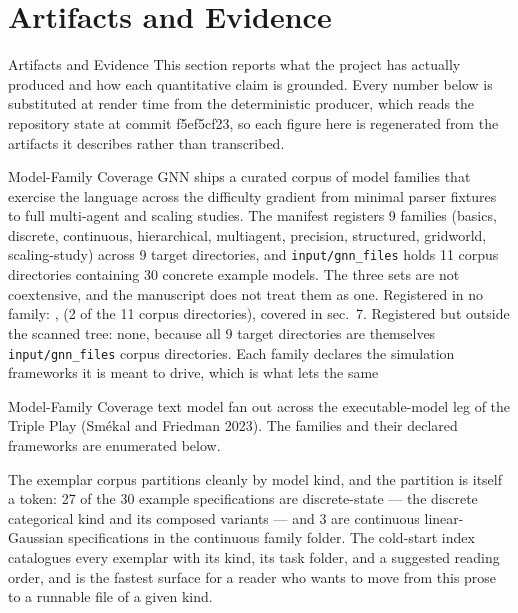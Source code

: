 \documentclass[
  ignorenonframetext,
]{beamer}
\author{\texorpdfstring{}{}}
\date{}
\newcounter{none} %
\begin{document}
\section{Artifacts and Evidence}\label{sec:artifacts_evidence}

\begin{frame}[allowframebreaks]{Artifacts and Evidence}
This section reports what the project has actually produced and how each
quantitative claim is grounded. Every number below is substituted at
render time from the deterministic producer, which reads the repository
state at commit f5ef5cf23, so each figure here is regenerated from the
artifacts it describes rather than transcribed.
\end{frame}

\begin{frame}{Model-Family Coverage}
\protect{}\label{model-family-coverage}
GNN ships a curated corpus of model families that exercise the language
across the difficulty gradient from minimal parser fixtures to full
multi-agent and scaling studies. The manifest registers 9 families
(basics, discrete, continuous, hierarchical, multiagent, precision,
structured, gridworld, scaling-study) across 9 target directories, and
\texttt{input/gnn\_files} holds 11 corpus directories containing 30
concrete example models. The three sets are not coextensive, and the
manuscript does not treat them as one. Registered in no family:
, 
(2 of the 11 corpus directories), covered in
sec.~7. Registered but outside the
scanned tree: none, because all 9 target directories are themselves
\texttt{input/gnn\_files} corpus directories. Each family declares the
simulation frameworks it is meant to drive, which is what lets the same
\end{frame}

\begin{frame}{Model-Family Coverage}
text model fan out across the executable-model leg of the Triple Play
(Smékal and Friedman 2023). The families and their declared frameworks
are enumerated below.

The exemplar corpus partitions cleanly by model kind, and the partition
is itself a token: 27 of the 30 example specifications are
discrete-state --- the discrete categorical kind and its composed
variants --- and 3 are continuous linear-Gaussian specifications in the
continuous family folder. The cold-start index
 catalogues every exemplar with its
kind, its task folder, and a suggested reading order, and is the fastest
surface for a reader who wants to move from this prose to a runnable
file of a given kind.

\end{frame}
\end{document}

